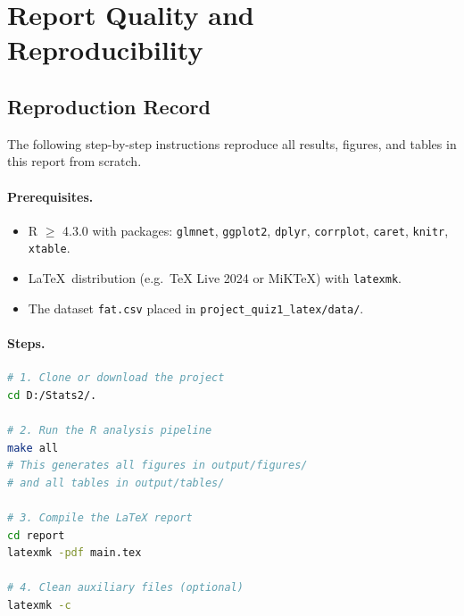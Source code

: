 \section{Report Quality and Reproducibility}
\label{sec:report-quality}

\subsection{Reproduction Record}
\label{sec:reproduction}

The following step-by-step instructions reproduce all results, figures, and
tables in this report from scratch.

\paragraph{Prerequisites.}
\begin{itemize}
    \item R $\geq$ 4.3.0 with packages: \texttt{glmnet}, \texttt{ggplot2},
          \texttt{dplyr}, \texttt{corrplot}, \texttt{caret}, \texttt{knitr},
          \texttt{xtable}.
    \item \LaTeX\ distribution (e.g.\ TeX Live 2024 or MiKTeX) with
          \texttt{latexmk}.
    \item The dataset \texttt{fat.csv} placed in
          \texttt{project\_quiz1\_latex/data/}.
\end{itemize}

\paragraph{Steps.}

\begin{lstlisting}[language=bash, caption={Reproduction commands.}]
# 1. Clone or download the project
cd D:/Stats2/.

# 2. Run the R analysis pipeline
make all
# This generates all figures in output/figures/
# and all tables in output/tables/

# 3. Compile the LaTeX report
cd report
latexmk -pdf main.tex

# 4. Clean auxiliary files (optional)
latexmk -c
\end{lstlisting}

